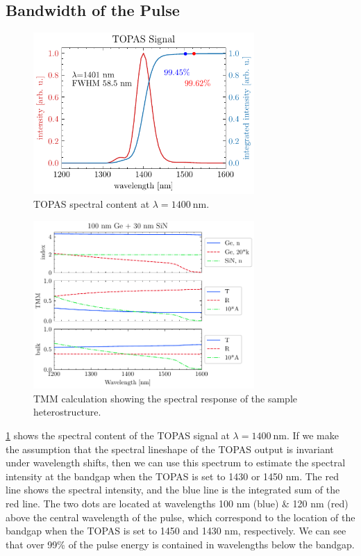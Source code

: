 \subsection{Bandwidth of the Pulse}

\begin{figure}
	\centering
	\includegraphics[width=0.75\textwidth]{figures/chap4/TOPAS_1400nm_spectral_inten.pdf}
	\caption{TOPAS spectral content at $\lambda = 1400 \ \textrm{nm}$.}
	\label{fig:TOPAS_1400nm_spectral_inten}
\end{figure}

\begin{figure}
	\centering
	\includegraphics[width=0.75\textwidth]{figures/chap4/tmm_vs_WL_1200-1600nm.pdf}
	\caption{TMM calculation showing the spectral response of the sample heterostructure.}
	\label{fig:tmm_vs_WL_1200-1600nm}
\end{figure}

\cref{fig:TOPAS_1400nm_spectral_inten} shows the spectral content of the TOPAS signal at $\lambda = 1400 \ \textrm{nm}$. If we make the assumption that the spectral lineshape of the TOPAS output is invariant under wavelength shifts, then we can use this spectrum to estimate the spectral intensity at the bandgap when the TOPAS is set to 1430 or 1450 nm. The red line shows the spectral intensity, and the blue line is the integrated sum of the red line. The two dots are located at wavelengths 100 nm (blue) \& 120 nm (red) above the central wavelength of the pulse, which correspond to the location of the bandgap when the TOPAS is set to 1450 and 1430 nm, respectively. We can see that over 99\% of the pulse energy is contained in wavelengths below the bandgap.

